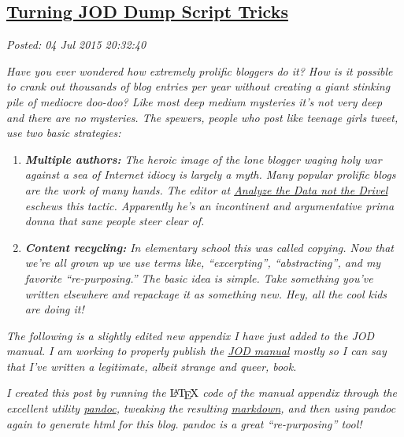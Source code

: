 %

\subsection*{\href{https://bakerjd99.wordpress.com/2015/07/04/turning-jod-dump-script-tricks/}{Turning JOD Dump Script Tricks}}


\noindent\emph{Posted: 04 Jul 2015 20:32:40}
\vspace{6pt}

\emph{Have you ever wondered how extremely prolific bloggers do it? How
is it possible to crank out thousands of blog entries per year without
creating a giant stinking pile of mediocre doo-doo? Like most deep
medium mysteries it's not very deep and there are no mysteries. The
spewers, people who post like teenage girls tweet, use two basic
strategies:}

\begin{enumerate}
\itemsep1pt\parskip0pt
\item
  \emph{\textbf{Multiple authors:} The heroic image of the lone blogger
  waging holy war against a sea of Internet idiocy is largely a myth.
  Many popular prolific blogs are the work of many hands. The editor at
  \href{https://bakerjd99.wordpress.com/}{Analyze the Data not the
  Drivel} eschews this tactic. Apparently he's an incontinent and
  argumentative prima donna that sane people steer clear of.}
\item
  \emph{\textbf{Content recycling:} In elementary school this was called
  copying. Now that we're all grown up we use terms like,
  ``excerpting'', ``abstracting'', and my favorite ``re-purposing.'' The
  basic idea is simple. Take something you've written elsewhere and
  repackage it as something new. Hey, all the cool kids are doing it!}
\end{enumerate}

\emph{The following is a slightly edited new appendix I have just added
to the JOD manual. I am working to properly publish the
\href{https://app.box.com/shared/gajfu50gc0}{JOD manual} mostly so I can
say that I've written a legitimate, albeit strange and queer, book.}

\emph{I created this post by running the} $\LaTeX$ \emph{code of the
manual appendix through the excellent utility
\href{http://pandoc.org/}{pandoc}, tweaking the resulting
\href{http://daringfireball.net/projects/markdown/syntax}{markdown}, and
then using pandoc again to generate html for this blog. pandoc is a
great ``re-purposing'' tool!}

